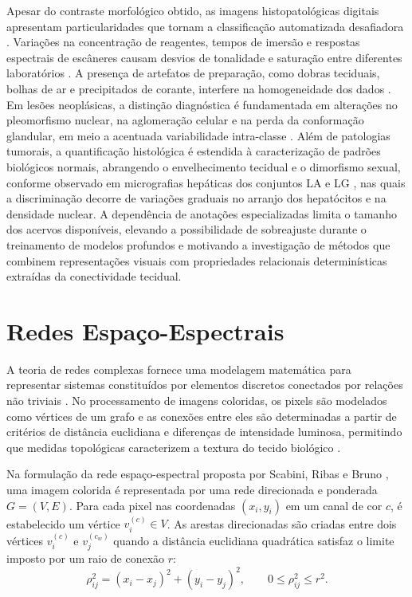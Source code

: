 Apesar do contraste morfológico obtido, as imagens histopatológicas digitais apresentam particularidades que tornam a classificação automatizada desafiadora \cite{srinidhi2021deep,litjens2017survey}. Variações na concentração de reagentes, tempos de imersão e respostas espectrais de escâneres causam desvios de tonalidade e saturação entre diferentes laboratórios \cite{bejnordi2017diagnostic,histImgColorectal}. A presença de artefatos de preparação, como dobras teciduais, bolhas de ar e precipitados de corante, interfere na homogeneidade dos dados \cite{srinidhi2021deep,autoHistImg}. Em lesões neoplásicas, a distinção diagnóstica é fundamentada em alterações no pleomorfismo nuclear, na aglomeração celular e na perda da conformação glandular, em meio a acentuada variabilidade intra-classe \cite{CR,clinicalReview}. Além de patologias tumorais, a quantificação histológica é estendida à caracterização de padrões biológicos normais, abrangendo o envelhecimento tecidual e o dimorfismo sexual, conforme observado em micrografias hepáticas dos conjuntos LA e LG \cite{iicbu2008}, nas quais a discriminação decorre de variações graduais no arranjo dos hepatócitos e na densidade nuclear. A dependência de anotações especializadas limita o tamanho dos acervos disponíveis, elevando a possibilidade de sobreajuste durante o treinamento de modelos profundos \cite{histImgColorectal,clinicalReview} e motivando a investigação de métodos que combinem representações visuais com propriedades relacionais determinísticas extraídas da conectividade tecidual.


\section{Redes Espaço-Espectrais}
\label{sec:redes-complexas}

A teoria de redes complexas fornece uma modelagem matemática para representar sistemas constituídos por elementos discretos conectados por relações não triviais \cite{BOCCALETTI2006175}. No processamento de imagens coloridas, os pixels são modelados como vértices de um grafo e as conexões entre eles são determinadas a partir de critérios de distância euclidiana e diferenças de intensidade luminosa, permitindo que medidas topológicas caracterizem a textura do tecido biológico \cite{BACKES2013168,ribas2020fusion,ribas2024colorspectral}.

Na formulação da rede espaço-espectral proposta por Scabini, Ribas e Bruno \cite{Scabini_2020}, uma imagem colorida é representada por uma rede direcionada e ponderada $G = (V, E)$. Para cada pixel nas coordenadas $(x_i, y_i)$ em um canal de cor $c$, é estabelecido um vértice $v_i^{(c)} \in V$. As arestas direcionadas são criadas entre dois vértices $v_i^{(c)}$ e $v_j^{(c_w)}$ quando a distância euclidiana quadrática satisfaz o limite imposto por um raio de conexão $r$:
\begin{equation}
\rho_{ij}^2 = (x_i - x_j)^2 + (y_i - y_j)^2, \qquad 0 \leq \rho_{ij}^2 \leq r^2.
\label{eq:cn-aresta}
\end{equation}


